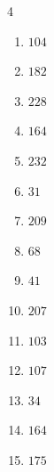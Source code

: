 \begin{multicols}{4}
\begin{enumerate}
  \item $104$


  \item $182$


  \item $228$


  \item $164$


  \item $232$


  \item $31$


  \item $209$


  \item $68$


\columnbreak %

\resetques

  \item $41$


  \item $207$


  \item $103$


  \item $107$


  \item $34$


  \item $164$


  \item $175$



\end{enumerate}
\end{multicols}

